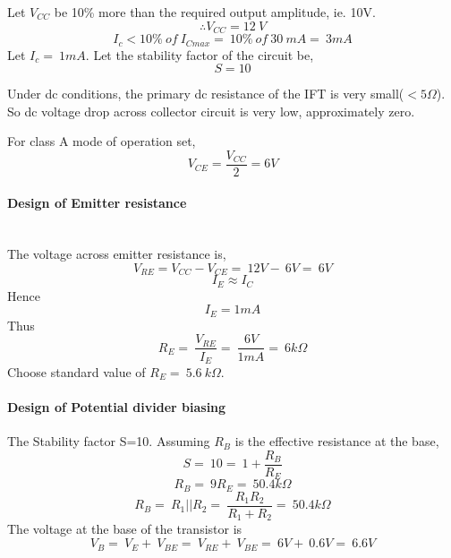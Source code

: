 \noindent Let $V_{CC}$ be 10\% more than the required output amplitude, ie. 10V.
\begin{equation}
\therefore V_{CC}=12\ V
\end{equation}
\begin{equation}
I_c<10 \% \ of \  I_{Cmax} =\ 10\%\  of\  30\  mA =\ 3 mA
\end{equation}
\noindent Let $I_c=\ 1 mA$.
Let the stability factor of the circuit be,
\begin{equation}
S=10
\end{equation}

\noindent Under dc  conditions, the primary dc resistance of the IFT is very small($<5\Omega$). So dc voltage drop across collector circuit is very low, approximately zero.

\noindent For class A mode of operation set, 
\begin{equation}
 V_{CE} = \frac{V_{CC}}{2}= 6 V
\end{equation}
\paragraph{Design of Emitter resistance}
\noindent \\The voltage across emitter resistance is,
\begin{equation}
V_{RE}=V_{CC}- V_{CE} =\ 12V-\ 6V=\ 6V
\end{equation}
\begin{equation}
I_E \approx I_C 
 \end{equation}
\noindent Hence
\begin{equation}
I_E = 1mA
\end{equation}
\noindent Thus
\begin{equation}
R_E=\ \frac{V_{RE}}{I_E}=\ \frac{6V}{1mA}=\ 6k\Omega
\end{equation}
\noindent Choose standard value of $R_E=\ 5.6 \ k\Omega$.
\paragraph{Design of Potential divider biasing\\}
\noindent The Stability factor S=10. Assuming $R_B$ is the effective resistance at the base,
\begin{equation}
S=\ 10=\ 1+\frac{R_B}{R_E}
\end{equation}
\begin{equation}
R_B=\ 9R_E=\ 50.4k\Omega
\end{equation}
\begin{equation}
\label{R1R2}
R_B=\ R_1||R_2=\ \frac{R_1R_2}{R_1+R_2}=\ 50.4k\Omega
\end{equation}
\noindent The voltage at the base of the transistor is 
\begin{equation}
V_B=\ V_E+\ V_{BE}=\ V_{RE}+\ V_{BE}=\ 6V+\ 0.6V=\ 6.6 V
\end{equation}

